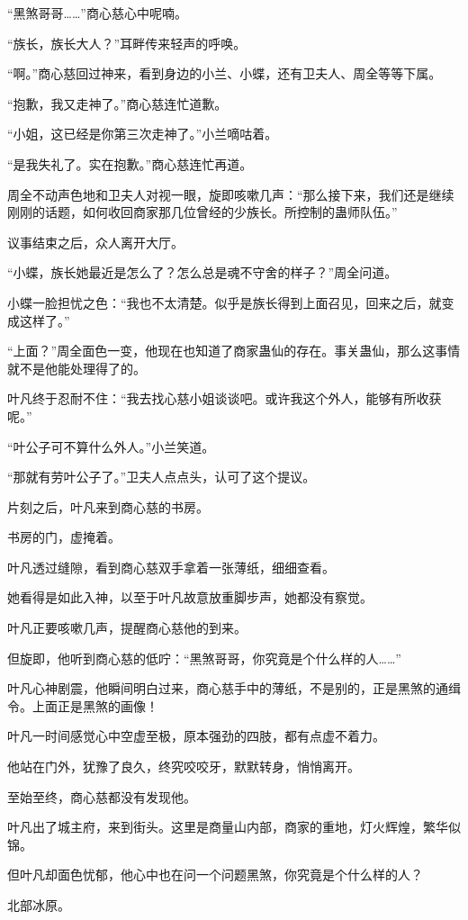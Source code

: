 \begin{this_body}
“黑煞哥哥……”商心慈心中呢喃。

“族长，族长大人？”耳畔传来轻声的呼唤。

“啊。”商心慈回过神来，看到身边的小兰、小蝶，还有卫夫人、周全等等下属。

“抱歉，我又走神了。”商心慈连忙道歉。

“小姐，这已经是你第三次走神了。”小兰嘀咕着。

“是我失礼了。实在抱歉。”商心慈连忙再道。

周全不动声色地和卫夫人对视一眼，旋即咳嗽几声：“那么接下来，我们还是继续刚刚的话题，如何收回商家那几位曾经的少族长。所控制的蛊师队伍。”

议事结束之后，众人离开大厅。

“小蝶，族长她最近是怎么了？怎么总是魂不守舍的样子？”周全问道。

小蝶一脸担忧之色：“我也不太清楚。似乎是族长得到上面召见，回来之后，就变成这样了。”

“上面？”周全面色一变，他现在也知道了商家蛊仙的存在。事关蛊仙，那么这事情就不是他能处理得了的。

叶凡终于忍耐不住：“我去找心慈小姐谈谈吧。或许我这个外人，能够有所收获呢。”

“叶公子可不算什么外人。”小兰笑道。

“那就有劳叶公子了。”卫夫人点点头，认可了这个提议。

片刻之后，叶凡来到商心慈的书房。

书房的门，虚掩着。

叶凡透过缝隙，看到商心慈双手拿着一张薄纸，细细查看。

她看得是如此入神，以至于叶凡故意放重脚步声，她都没有察觉。

叶凡正要咳嗽几声，提醒商心慈他的到来。

但旋即，他听到商心慈的低咛：“黑煞哥哥，你究竟是个什么样的人……”

叶凡心神剧震，他瞬间明白过来，商心慈手中的薄纸，不是别的，正是黑煞的通缉令。上面正是黑煞的画像！

叶凡一时间感觉心中空虚至极，原本强劲的四肢，都有点虚不着力。

他站在门外，犹豫了良久，终究咬咬牙，默默转身，悄悄离开。

至始至终，商心慈都没有发现他。

叶凡出了城主府，来到街头。这里是商量山内部，商家的重地，灯火辉煌，繁华似锦。

但叶凡却面色忧郁，他心中也在问一个问题黑煞，你究竟是个什么样的人？

北部冰原。


\end{this_body}
